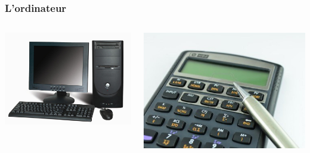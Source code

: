 \documentclass{beamer}
\begin{document}
	\begin{frame}
		\frametitle{L'ordinateur}
		\begin{columns}
			\begin{column}[c]{5cm}
				\includegraphics[scale=0.2]{image/PC.jpg}
			\end{column}
			\begin{column}[c]{5cm}
				\includegraphics[scale=0.15]{image/calculette.jpg}
			\end{column}
		\end{columns}
	\end{frame}
\end{document}
